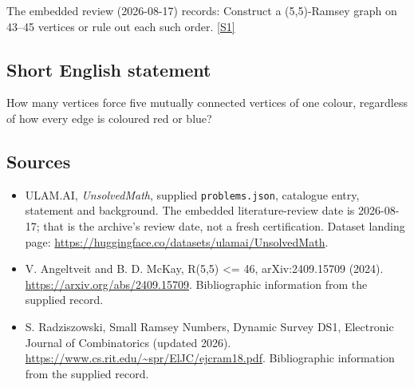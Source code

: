 \documentclass[11pt,a4paper]{article}
\newcommand{\sref}[2]{\hyperlink{source:#1:#2}{[S#2]}}
\begin{document}
The embedded review (2026-08-17) records: Construct a (5,5)-Ramsey graph on 43--45 vertices or rule out each such order. \sref{statement}{1}

\subsection{Short English statement}

How many vertices force five mutually connected vertices of one colour, regardless of how every edge is coloured red or blue?

\subsection{Sources}

{\small

\begin{itemize}

\item[\hypertarget{source:statement:1}{S1}] ULAM.AI, \emph{UnsolvedMath}, supplied \texttt{problems.json}, catalogue entry, statement and background. The embedded literature-review date is 2026-08-17; that is the archive’s review date, not a fresh certification. Dataset landing page: \url{https://huggingface.co/datasets/ulamai/UnsolvedMath}.

\item[\hypertarget{source:statement:2}{S2}] V. Angeltveit and B. D. McKay, R(5,5) <= 46, arXiv:2409.15709 (2024). \url{https://arxiv.org/abs/2409.15709}. Bibliographic information from the supplied record.

\item[\hypertarget{source:statement:3}{S3}] S. Radziszowski, Small Ramsey Numbers, Dynamic Survey DS1, Electronic Journal of Combinatorics (updated 2026). \url{https://www.cs.rit.edu/~spr/ElJC/ejcram18.pdf}. Bibliographic information from the supplied record.

\end{itemize}

}

\label{end:statement}
\end{document}
